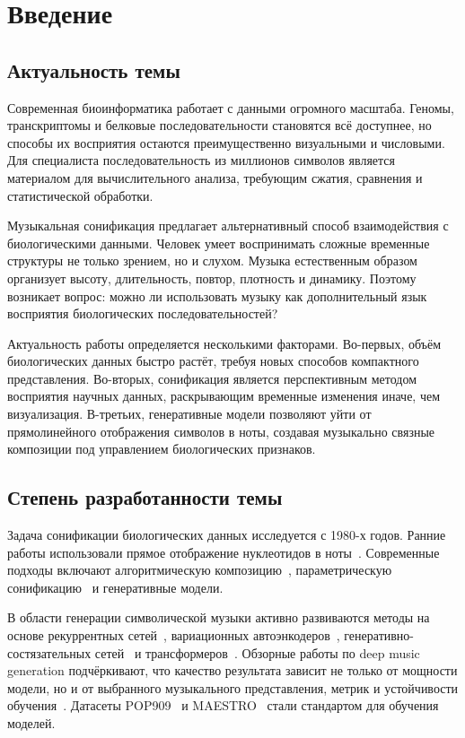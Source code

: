 \chapter*{Введение}

\section*{Актуальность темы}

Современная биоинформатика работает с данными огромного масштаба. Геномы, транскриптомы и белковые последовательности становятся всё доступнее, но способы их восприятия остаются преимущественно визуальными и числовыми. Для специалиста последовательность из миллионов символов является материалом для вычислительного анализа, требующим сжатия, сравнения и статистической обработки.

Музыкальная сонификация предлагает альтернативный способ взаимодействия с биологическими данными. Человек умеет воспринимать сложные временные структуры не только зрением, но и слухом. Музыка естественным образом организует высоту, длительность, повтор, плотность и динамику. Поэтому возникает вопрос: можно ли использовать музыку как дополнительный язык восприятия биологических последовательностей?

Актуальность работы определяется несколькими факторами. Во-первых, объём биологических данных быстро растёт, требуя новых способов компактного представления. Во-вторых, сонификация является перспективным методом восприятия научных данных, раскрывающим временные изменения иначе, чем визуализация. В-третьих, генеративные модели позволяют уйти от прямолинейного отображения символов в ноты, создавая музыкально связные композиции под управлением биологических признаков.

\section*{Степень разработанности темы}

Задача сонификации биологических данных исследуется с 1980-х годов. Ранние работы использовали прямое отображение нуклеотидов в ноты~\cite{ohno1986}. Современные подходы включают алгоритмическую композицию~\cite{temple2017}, параметрическую сонификацию~\cite{grond2011} и генеративные модели.

В области генерации символической музыки активно развиваются методы на основе рекуррентных сетей~\cite{eck2002}, вариационных автоэнкодеров~\cite{roberts2018}, генеративно-состязательных сетей~\cite{dong2018} и трансформеров~\cite{huang2018}. Обзорные работы по deep music generation подчёркивают, что качество результата зависит не только от мощности модели, но и от выбранного музыкального представления, метрик и устойчивости обучения~\cite{briot2017,ji2020}. Датасеты POP909~\cite{wang2020} и MAESTRO~\cite{hawthorne2019} стали стандартом для обучения моделей.

